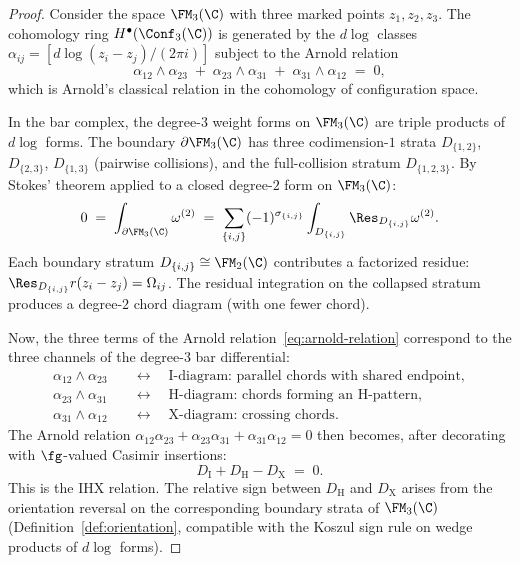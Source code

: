 \begin{proof}
Consider the space $\FM_3(\C)$ with three marked points
$z_1, z_2, z_3$. The cohomology ring
$H^\bullet(\Conf_3(\C))$ is generated by the $d\log$ classes
$\alpha_{ij} = [d\log(z_i - z_j)/(2\pi i)]$ subject to the
Arnold relation
\begin{equation}\label{eq:arnold-relation}
\alpha_{12} \wedge \alpha_{23}
\;+\;
\alpha_{23} \wedge \alpha_{31}
\;+\;
\alpha_{31} \wedge \alpha_{12}
\;=\; 0,
\end{equation}
which is Arnold's classical relation in the cohomology of
configuration space.

In the bar complex, the degree-$3$ weight forms on $\FM_3(\C)$
are triple products of $d\log$ forms. The boundary
$\partial\FM_3(\C)$ has three codimension-$1$ strata
$D_{\{1,2\}}$, $D_{\{2,3\}}$, $D_{\{1,3\}}$
(pairwise collisions), and the full-collision stratum
$D_{\{1,2,3\}}$. By Stokes' theorem applied to a closed
degree-$2$ form on $\FM_3(\C)$:
\[
0
\;=\;
\int_{\partial \FM_3(\C)} \omega^{(2)}
\;=\;
\sum_{\{i,j\}} (-1)^{\sigma_{\{i,j\}}}
\int_{D_{\{i,j\}}} \Res_{D_{\{i,j\}}} \omega^{(2)}.
\]
Each boundary stratum $D_{\{i,j\}} \cong \FM_2(\C)$
contributes a factorized residue:
$\Res_{D_{\{i,j\}}} r(z_i - z_j) = \Omega_{ij}$. The
residual integration on the collapsed stratum produces a
degree-$2$ chord diagram (with one fewer chord).

Now, the three terms of the Arnold
relation~\eqref{eq:arnold-relation} correspond to the three
channels of the degree-$3$ bar differential:
\begin{align}
\alpha_{12} \wedge \alpha_{23}
 &\quad\longleftrightarrow\quad
 \text{I-diagram: parallel chords with shared endpoint},
 \label{eq:I-channel} \\
\alpha_{23} \wedge \alpha_{31}
 &\quad\longleftrightarrow\quad
 \text{H-diagram: chords forming an H-pattern},
 \label{eq:H-channel} \\
\alpha_{31} \wedge \alpha_{12}
 &\quad\longleftrightarrow\quad
 \text{X-diagram: crossing chords}.
 \label{eq:X-channel}
\end{align}
The Arnold relation
$\alpha_{12}\alpha_{23} + \alpha_{23}\alpha_{31}
+ \alpha_{31}\alpha_{12} = 0$ then becomes, after decorating
with $\fg$-valued Casimir insertions:
\begin{equation}\label{eq:IHX-from-Arnold}
\boxed{
D_{\mathrm{I}} + D_{\mathrm{H}} - D_{\mathrm{X}} \;=\; 0.}
\end{equation}
This is the IHX relation. The relative sign between
$D_{\mathrm{H}}$ and $D_{\mathrm{X}}$ arises from the
orientation reversal on the corresponding boundary strata of
$\FM_3(\C)$
(Definition~\ref{def:orientation}, compatible with the Koszul
sign rule on wedge products of $d\log$ forms).
\end{proof}

